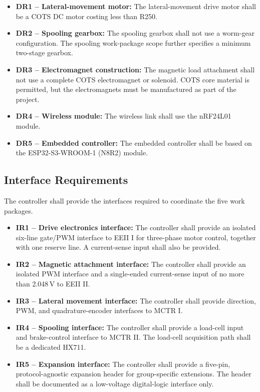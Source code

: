 \begin{itemize}
    \item \textbf{DR1 -- Lateral-movement motor:}
    The lateral-movement drive motor shall be a COTS DC motor
    costing less than R250.

    \item \textbf{DR2 -- Spooling gearbox:}
    The spooling gearbox shall not use a worm-gear configuration.
    The spooling work-package scope further specifies a
    minimum two-stage gearbox.

    \item \textbf{DR3 -- Electromagnet construction:}
    The magnetic load attachment shall not use a complete
    COTS electromagnet or solenoid. COTS core material is
    permitted, but the electromagnets must be manufactured
    as part of the project.

    \item \textbf{DR4 -- Wireless module:}
    The wireless link shall use the nRF24L01 module.

    \item \textbf{DR5 -- Embedded controller:}
    The embedded controller shall be based on the
    ESP32-S3-WROOM-1 (N8R2) module.
\end{itemize}


\subsection{Interface Requirements}
\label{subsec:interface-req}

The controller shall provide the interfaces required to
coordinate the five work packages.

\begin{itemize}
    \item \textbf{IR1 -- Drive electronics interface:}
    The controller shall provide an isolated six-line
    gate/PWM interface to EEII I for three-phase motor
    control, together with one reserve line. A current-sense
    input shall also be provided.

    \item \textbf{IR2 -- Magnetic attachment interface:}
    The controller shall provide an isolated PWM interface
    and a single-ended current-sense input of no more than
    2.048\,V to EEII II.

    \item \textbf{IR3 -- Lateral movement interface:}
    The controller shall provide direction, PWM, and
    quadrature-encoder interfaces to MCTR I.

    \item \textbf{IR4 -- Spooling interface:}
    The controller shall provide a load-cell input and
    brake-control interface to MCTR II. The load-cell
    acquisition path shall be a dedicated HX711.

    \item \textbf{IR5 -- Expansion interface:}
    The controller shall provide a five-pin, protocol-agnostic
    expansion header for group-specific extensions. The
    header shall be documented as a low-voltage digital-logic
    interface only.
\end{itemize}


